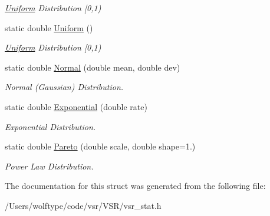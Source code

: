 \begin{DoxyCompactItemize}
\begin{DoxyCompactList}\small\item\em \hyperlink{structvsr_1_1_uniform}{Uniform} Distribution \mbox{[}0,1) \end{DoxyCompactList}\item 
\hypertarget{structvsr_1_1_rand_a666f153185415aa27ee31b86912ef40b}{static double \hyperlink{structvsr_1_1_rand_a666f153185415aa27ee31b86912ef40b}{Uniform} ()}\label{structvsr_1_1_rand_a666f153185415aa27ee31b86912ef40b}

\begin{DoxyCompactList}\small\item\em \hyperlink{structvsr_1_1_uniform}{Uniform} Distribution \mbox{[}0,1) \end{DoxyCompactList}\item 
\hypertarget{structvsr_1_1_rand_a017fe55e4d1ef24e63ce935ddc6b377b}{static double \hyperlink{structvsr_1_1_rand_a017fe55e4d1ef24e63ce935ddc6b377b}{Normal} (double mean, double dev)}\label{structvsr_1_1_rand_a017fe55e4d1ef24e63ce935ddc6b377b}

\begin{DoxyCompactList}\small\item\em Normal (Gaussian) Distribution. \end{DoxyCompactList}\item 
\hypertarget{structvsr_1_1_rand_ac728144fa5fcd42e5edaf6994268bd38}{static double \hyperlink{structvsr_1_1_rand_ac728144fa5fcd42e5edaf6994268bd38}{Exponential} (double rate)}\label{structvsr_1_1_rand_ac728144fa5fcd42e5edaf6994268bd38}

\begin{DoxyCompactList}\small\item\em Exponential Distribution. \end{DoxyCompactList}\item 
\hypertarget{structvsr_1_1_rand_a93c9754bedca39ef65cd35f62d02747d}{static double \hyperlink{structvsr_1_1_rand_a93c9754bedca39ef65cd35f62d02747d}{Pareto} (double scale, double shape=1.)}\label{structvsr_1_1_rand_a93c9754bedca39ef65cd35f62d02747d}

\begin{DoxyCompactList}\small\item\em Power Law Distribution. \end{DoxyCompactList}\end{DoxyCompactItemize}


The documentation for this struct was generated from the following file\-:\begin{DoxyCompactItemize}
\item 
/\-Users/wolftype/code/vsr/\-V\-S\-R/vsr\-\_\-stat.\-h\end{DoxyCompactItemize}

